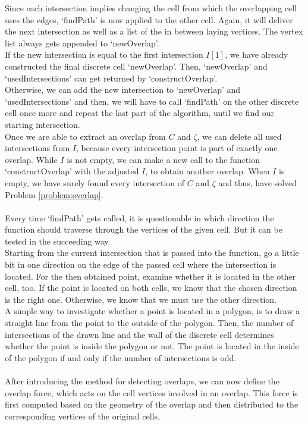 Since each intersection implies changing the cell from which the overlapping cell uses the edges, `findPath' is now applied to the other cell. Again, it will deliver the next intersection as well as a list of the in between laying vertices. The vertex list always gets appended to `newOverlap'. \\
If the new intersection is equal to the first intersection $I[1]$, we have already constructed the final discrete cell `newOverlap'. Then, `newOverlap' and `usedIntersections' can get returned by `constructOverlap'. \\
Otherwise, we can add the new intersection to `newOverlap' and `usedIntersections' and then, we will have to call `findPath' on the other discrete cell once more and repeat the last part of the algorithm, until we find our starting intersection. \\
Once we are able to extract an overlap from $C$ and $\zeta$, we can delete all used intersections from $I$, because every intersection point is part of exactly one overlap. While $I$ is not empty, we can make a new call to the function `constructOverlap' with the adjusted $I$, to obtain another overlap. When $I$ is empty, we have surely found every intersection of $C$ and $\zeta$ and thus, have solved Problem \ref{problem:overlap}. \\
\smallskip \\
Every time `findPath' gets called, it is questionable in which direction the function should traverse through the vertices of the given cell. But it can be tested in the succeeding way. \\
Starting from the current intersection that is passed into the function, go a little bit in one direction on the edge of the passed cell where the intersection is located. For the then obtained point, examine whether it is located in the other cell, too. If the point is located on both cells, we know that the chosen direction is the right one. Otherwise, we know that we must use the other direction. \\ 
A simple way to investigate whether a point is located in a polygon, is to draw a straight line from the point to the outside of the polygon. Then, the number of intersections of the drawn line and the wall of the discrete cell determines whether the point is inside the polygon or not. The point is located in the inside of the polygon if and only if the number of intersections is odd. \\ 
\smallskip  \\
After introducing the method for detecting overlaps, we can now define the overlap force, which acts on the cell vertices involved in an overlap. 
This force is first computed based on the geometry of the overlap and then distributed to the corresponding vertices of the original cells. 

